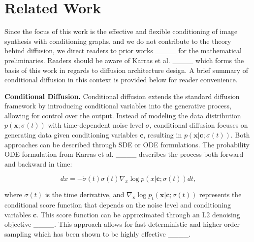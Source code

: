\section{Related Work}
\label{sec:related_work}

Since the focus of this work is the effective and flexible conditioning of image synthesis with conditioning graphs, and we do not contribute to the theory behind diffusion, we direct readers to prior works ____ for the mathematical preliminaries. Readers should be aware of Karras et al. ____ which forms the basis of this work in regards to diffusion architecture design. A brief summary of conditional diffusion in this context is provided below for reader convenience.

\textbf{Conditional Diffusion.} Conditional diffusion extends the standard diffusion framework by introducing conditional variables into the generative process, allowing for control over the output. Instead of modeling the data distribution \( p(\mathbf{x}; \sigma(t)) \) with time-dependent noise level $\sigma$, conditional diffusion focuses on generating data given conditioning variables \( \mathbf{c} \), resulting in \( p(\mathbf{x} | \mathbf{c}; \sigma(t)) \). Both approaches can be described through SDE or ODE formulations. The probability ODE formulation from Karras et al. ____ describes the process both forward and backward in time:

\begin{equation}
    dx = -\dot{\sigma}(t)\sigma(t) \nabla_x \log p(x| \mathbf{c}; \sigma(t)) dt,
    \label{eq:karras_1}
\end{equation}

where \(\dot{\sigma}(t)\) is the time derivative, and \( \nabla_{\mathbf{x}} \log p_t(\mathbf{x} | \mathbf{c}; \sigma(t)) \) represents the conditional score function that depends on the noise level and conditioning variables $\mathbf{c}$. This score function can be approximated through an L2 denoising objective ____. This approach allows for fast deterministic and higher-order sampling which has been shown to be highly effective ____.

